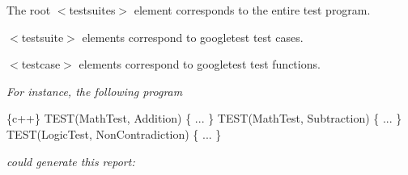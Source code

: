 {\itshape 
\begin{DoxyItemize}
\item The root {\ttfamily $<$testsuites$>$} element corresponds to the entire test program.
\item {\ttfamily $<$testsuite$>$} elements correspond to googletest test cases.
\item {\ttfamily $<$testcase$>$} elements correspond to googletest test functions.
\end{DoxyItemize}}

{\itshape For instance, the following program}

{\itshape 
\begin{DoxyCode}
\{c++\}
TEST(MathTest, Addition) \{ ... \}
TEST(MathTest, Subtraction) \{ ... \}
TEST(LogicTest, NonContradiction) \{ ... \}
\end{DoxyCode}
}

{\itshape could generate this report\+:}

